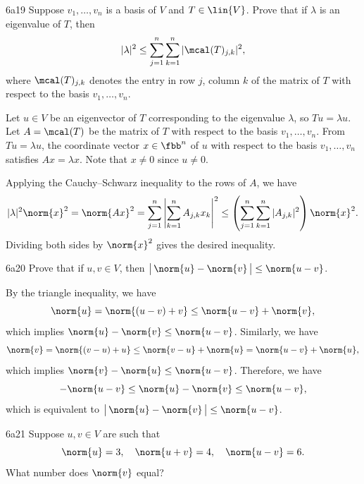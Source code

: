 \begin{exercise}{6a19}
    Suppose $v_1, \ldots, v_n$ is a basis of $V$ and $T \in \lin{V}$.
    Prove that if $\lambda$ is an eigenvalue of $T$, then
    \[
        |\lambda|^2 \leq \sum_{j=1}^{n} \sum_{k=1}^{n} |\mcal(T)_{j,k}|^2,
    \]
    where $\mcal(T)_{j,k}$ denotes the entry in row $j$, column $k$ of the matrix of $T$ with respect to the basis $v_1, \ldots, v_n$.
\end{exercise}

\begin{sol}
    Let $u \in V$ be an eigenvector of $T$ corresponding to the eigenvalue $\lambda$, so $Tu = \lambda u$.
    Let $A = \mcal(T)$ be the matrix of $T$ with respect to the basis $v_1, \ldots, v_n$.
    From $Tu = \lambda u$, the coordinate vector $x \in \fbb^n$ of $u$ with respect to the basis $v_1, \ldots, v_n$ satisfies $Ax = \lambda x$.
    Note that $x \neq 0$ since $u \neq 0$.

    Applying the Cauchy--Schwarz inequality to the rows of $A$, we have
    \[
        |\lambda|^2 \norm{x}^2 = \norm{Ax}^2 = \sum_{j=1}^{n} \left|\sum_{k=1}^{n} A_{j,k} x_k\right|^2 \leq \left(\sum_{j=1}^{n} \sum_{k=1}^{n} |A_{j,k}|^2\right)\norm{x}^2.
    \]
    Dividing both sides by $\norm{x}^2$ gives the desired inequality.
\end{sol}

\begin{exercise}{6a20}
    Prove that if $u, v \in V$, then $\bigl|\, \norm{u} - \norm{v}\, \bigr| \leq \norm{u - v}$.
    
\end{exercise}

\begin{sol}
    By the triangle inequality, we have
    \[
        \norm{u} = \norm{(u - v) + v} \leq \norm{u - v} + \norm{v},
    \]
    which implies $\norm{u} - \norm{v} \leq \norm{u - v}$.
    Similarly, we have
    \[
        \norm{v} = \norm{(v - u) + u} \leq \norm{v - u} + \norm{u} = \norm{u - v} + \norm{u},
    \]
    which implies $\norm{v} - \norm{u} \leq \norm{u - v}$.
    Therefore, we have
    \[
        -\norm{u - v} \leq \norm{u} - \norm{v} \leq \norm{u - v},
    \]
    which is equivalent to $\bigl|\,\norm{u} - \norm{v}\,\bigr| \leq \norm{u - v}$.
\end{sol}

\begin{exercise}{6a21}
    Suppose $u, v \in V$ are such that
    \[
        \norm{u} = 3, \quad \norm{u + v} = 4, \quad \norm{u - v} = 6.
    \]
    What number does $\norm{v}$ equal?
\end{exercise}

